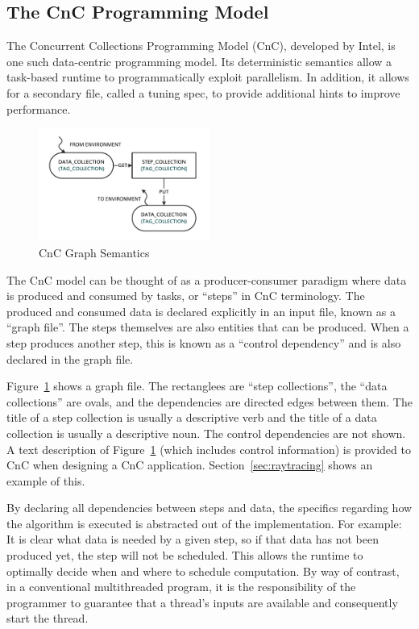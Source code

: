 \subsection{The CnC Programming Model}
\label{sec:cnc}

The Concurrent Collections Programming Model (CnC), developed by
Intel, is one such data-centric programming model. Its deterministic
semantics allow a task-based runtime to programmatically exploit
parallelism. In addition, it allows for a secondary file, called a
tuning spec, to provide additional hints to improve performance.

\begin{figure}[t!]
  \centering
  \includegraphics[width=0.5\textwidth]{drawings/CnCExample.pdf}
  \caption{CnC Graph Semantics}
  \label{fig:cnc_graph}
\end{figure}

The CnC model can be thought of as a producer-consumer paradigm where
data is produced and consumed by tasks, or ``steps'' in CnC
terminology. The produced and consumed data is declared explicitly in
an input file, known as a ``graph file''. The steps themselves are
also entities that can be produced. When a step produces another step,
this is known as a ``control dependency'' and is also declared in the
graph file.

Figure~\ref{fig:cnc_graph} shows a graph file. The rectanglees are
``step collections'', the ``data collections'' are ovals, and the
dependencies are directed edges between them. The title of a step
collection is usually a descriptive verb and the title of a data
collection is usually a descriptive noun. The control dependencies are
not shown. A text description of Figure~\ref{fig:cnc_graph} (which
includes control information) is provided to CnC when designing a CnC
application.
Section~\ref{sec:raytracing} shows an example of this.

By declaring all dependencies between steps and data, the specifics
regarding how the algorithm is executed is abstracted out of the
implementation. For example: It is clear what data is needed by a
given step, so if that data has not been produced yet, the step will
not be scheduled. This allows the runtime to optimally decide when and
where to schedule computation. By way of contrast, in a conventional
multithreaded program, it is the responsibility of the programmer to
guarantee that a thread's inputs are available and consequently start
the thread.

